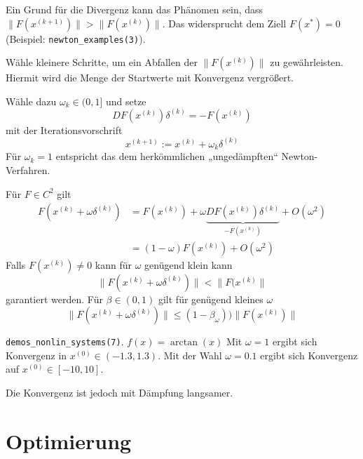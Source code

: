 \documentclass[11pt]{scrartcl}
\begin{document}
Ein Grund für die Divergenz kann das Phänomen sein, dass $\|F(x^{(k+1)})\| > \|F(x^{(k)})\|$.
Das widersprucht dem Ziell $F(x^*) = 0$ (Beispiel: \verb|newton_examples(3)|).

\begin{seg}
	Wähle kleinere Schritte, um ein Abfallen der $\|F(x^{(k)})\|$ zu gewährleisten. 
	Hiermit wird die Menge der Startwerte mit Konvergenz vergrößert.

	Wähle dazu $\omega_k \in (0,1]$ und setze
	\[
		DF(x^{(k)}) \delta^{(k)} = - F(x^{(k)})
	\]
	mit der Iterationsvorschrift
	\[
		x^{(k+1)} := x^{(k)} + \omega_k \delta^{(k)}
	\]
	Für $\omega_k = 1$ entspricht das dem herkömmlichen „ungedämpften“ Newton-Verfahren.

	Für $F \in C^2$ gilt
	\begin{align*}
		F(x^{(k)} + \omega \delta^{(k)}) &= F(x^{(k)}) + \omega \underbrace{DF(x^{(k)})\delta^{(k)}}_{-F(x^{(k)})} + O(\omega^2) \\
		&= (1 - \omega)F(x^{(k)}) + O(\omega^2)
	\end{align*}
	Falls $F(x^{(k)}) \neq 0$ kann für $\omega$ genügend klein kann
	\[
		\|F(x^{(k)} + \omega \delta^{(k)}) \| < \|F(x^{(k)}\|
	\]
	garantiert werden.
	Für $\beta \in (0,1)$ gilt für genügend kleines $\omega$
	\[
		\|F(x^{(k)} + \omega \delta^{(k)})\|  \le (1 - \beta_\omega)) \|F(x^{(k)})\|
	\]
	\begin{ex*}
		\verb|demos_nonlin_systems(7)|.
		$f(x) = \arctan(x)$
		Mit $\omega = 1$ ergibt sich Konvergenz in $x^{(0)} \in (-1.3, 1.3)$.
		Mit der Wahl $\omega = 0.1$ ergibt sich Konvergenz auf $x^{(0)} \in [-10, 10]$.

		Die Konvergenz ist jedoch mit Dämpfung langsamer.
	\end{ex*}
\end{seg}



\section{Optimierung}
\end{document}
